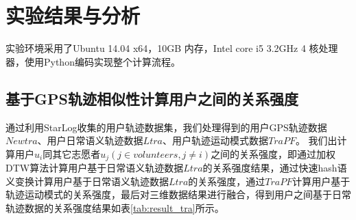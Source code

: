 \section{实验结果与分析}
\label{sec:section5-3}
实验环境采用了Ubuntu 14.04 x64，10GB 内存，Intel core i5 3.2GHz 4 核处理器，使用Python编码实现整个计算流程。
\subsection{基于GPS轨迹相似性计算用户之间的关系强度}
通过利用StarLog收集的用户轨迹数据集，我们处理得到的用户GPS轨迹数据$Newtra$、用户日常语义轨迹数据$Ltra$、用户轨迹运动模式数据$TraPF$。 我们出计算用户$u_{i}$同其它志愿者$u_{j}(j \in volunteers, j \neq i)$之间的关系强度，即通过加权DTW算法计算用户基于日常语义轨迹数据$Ltra$的关系强度结果，通过快速hash语义变换计算用户基于日常语义轨迹数据$Ltra$的关系强度，通过$TraPF$计算用户基于轨迹运动模式的关系强度，最后对三维数据结果进行融合，得到用户之间基于日常轨迹数据的关系强度结果如表\ref{tab:result_tra}所示。
